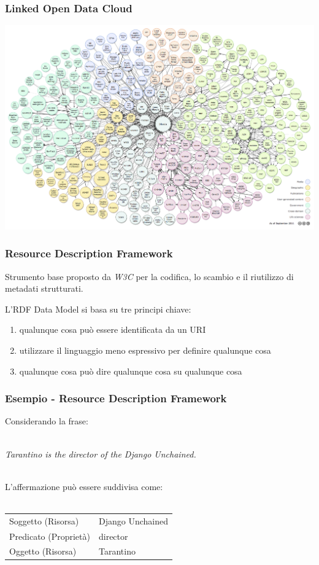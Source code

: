 \documentclass{beamer}
\begin{document}

\begin{frame}
\frametitle{Linked Open Data Cloud}
\includegraphics[width=.95\textwidth]{figure/lodcloud}
\end{frame}


\begin{frame}
\frametitle{Resource Description Framework}
Strumento base proposto da \emph{W3C} per la codifica, lo scambio e il riutilizzo di metadati strutturati.

L'RDF Data Model si basa su tre principi chiave:
\begin{enumerate}
\item qualunque cosa può essere identificata da un URI
\item utilizzare il linguaggio meno espressivo per definire qualunque cosa
\item qualunque cosa può dire qualunque cosa su qualunque cosa
\end{enumerate}
\end{frame}


\begin{frame}
\frametitle{Esempio - Resource Description Framework}
Considerando la frase:\\~\\
\begin{center} \emph{Tarantino is the director of the Django Unchained.} \\~\\
\end{center}
L'affermazione può essere suddivisa come: \\~\\
\begin{tabular}{ l | l }
 Soggetto (Risorsa) & Django Unchained \\
 Predicato (Proprietà) & director \\
 Oggetto (Risorsa) & Tarantino \\
\end{tabular}
\end{frame}
\end{document}
